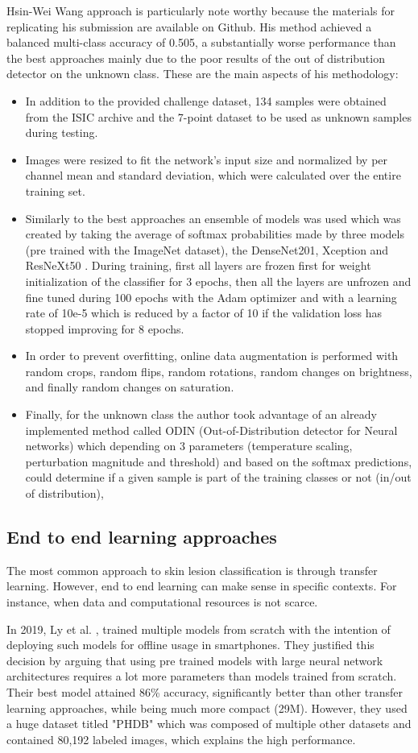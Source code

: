 Hsin-Wei Wang approach \cite{Wang} is particularly note worthy because the materials for replicating his submission are available on Github. His method achieved a balanced multi-class accuracy of 0.505, a substantially worse performance than the best approaches mainly due to the poor results of the out of distribution detector on the unknown class. These are the main aspects of his methodology: 
\begin{itemize}
    \item In addition to the provided challenge dataset, 134 samples were obtained from the ISIC archive and the 7-point dataset to be used as unknown samples during testing. 
    \item Images were resized to fit the network's input size and normalized by per channel mean and standard deviation, which were calculated over the entire training set. 
    \item Similarly to the best approaches an ensemble of models was used which was created by taking the average of softmax probabilities made by three models (pre trained with the ImageNet dataset), the DenseNet201, Xception and ResNeXt50 . During training, first all layers are frozen first for weight initialization of the classifier for 3 epochs, then all the layers are unfrozen and fine tuned during 100 epochs with the Adam optimizer \cite{adam} and with a learning rate of 10e-5 which is reduced by a factor of 10 if the validation loss has stopped improving for 8 epochs. 
    \item In order to prevent overfitting, online data augmentation is performed with random crops, random flips, random rotations, random changes on brightness, and finally random changes on saturation.  
    \item Finally, for the unknown class the author took advantage of an already implemented method called ODIN (Out-of-Distribution detector for Neural networks) \cite{odin} which depending on 3 parameters (temperature scaling, perturbation magnitude and threshold) and based on the softmax predictions, could determine if a given sample is part of the training classes or not (in/out of distribution), 
\end{itemize}
\subsection{End to end learning approaches}
The most common approach to skin lesion classification is through transfer learning. However, end to end learning can make sense in specific contexts. For instance, when data and computational resources is not scarce. \par 
In 2019, Ly et al. \cite{Ly2019}, trained multiple models from scratch with the intention of deploying such models for offline usage in smartphones. They justified this decision by arguing that using pre trained models with large neural network architectures requires a lot more parameters than models trained from scratch. Their best model attained 86\% accuracy, significantly better than other transfer learning approaches, while being much more compact (29M). However, they used a huge dataset titled "PHDB" which was composed of multiple other datasets and contained 80,192 labeled images, which explains the high performance.

